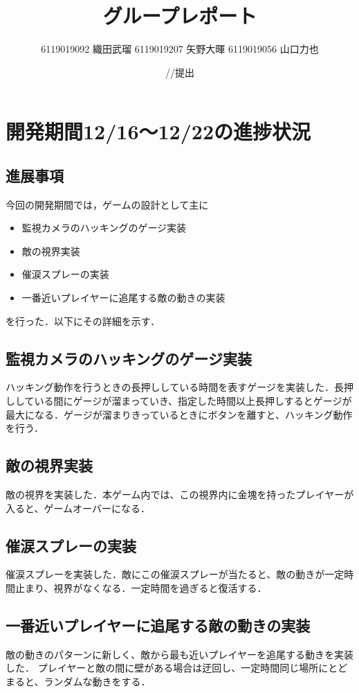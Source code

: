 \documentclass{jarticle}
\title{グループレポート}
\author{6119019092 織田武瑠 6119019207 矢野大暉 6119019056 山口力也}
\date{\number\year/\number\month/\number\day 提出}
\newcommand{\xa}{監視カメラのハッキングのゲージ実装}
\newcommand{\xb}{敵の視界実装}
\newcommand{\xc}{催涙スプレーの実装}
\newcommand{\xd}{一番近いプレイヤーに追尾する敵の動きの実装}
\newcommand{\pitem}[4]{
\item #1
\item #2
\item #3
\item #4
}
\begin{document}
\maketitle

\section{開発期間12/16～12/22の進捗状況} 

\subsection{進展事項}
今回の開発期間では，ゲームの設計として主に
\begin{itemize}
\pitem{\xa}{\xb}{\xc}{\xd}
\end{itemize}
を行った．以下にその詳細を示す．

\subsection{\xa}
ハッキング動作を行うときの長押ししている時間を表すゲージを実装した．長押ししている間にゲージが溜まっていき、指定した時間以上長押しするとゲージが最大になる．ゲージが溜まりきっているときにボタンを離すと、ハッキング動作を行う．

\subsection{\xb}
敵の視界を実装した．本ゲーム内では、この視界内に金塊を持ったプレイヤーが入ると、ゲームオーバーになる．

\subsection{\xc}
催涙スプレーを実装した．敵にこの催涙スプレーが当たると、敵の動きが一定時間止まり、視界がなくなる．一定時間を過ぎると復活する．

\subsection{\xd}
敵の動きのパターンに新しく、敵から最も近いプレイヤーを追尾する動きを実装した．
プレイヤーと敵の間に壁がある場合は迂回し、一定時間同じ場所にとどまると、ランダムな動きをする．
\end{document}
